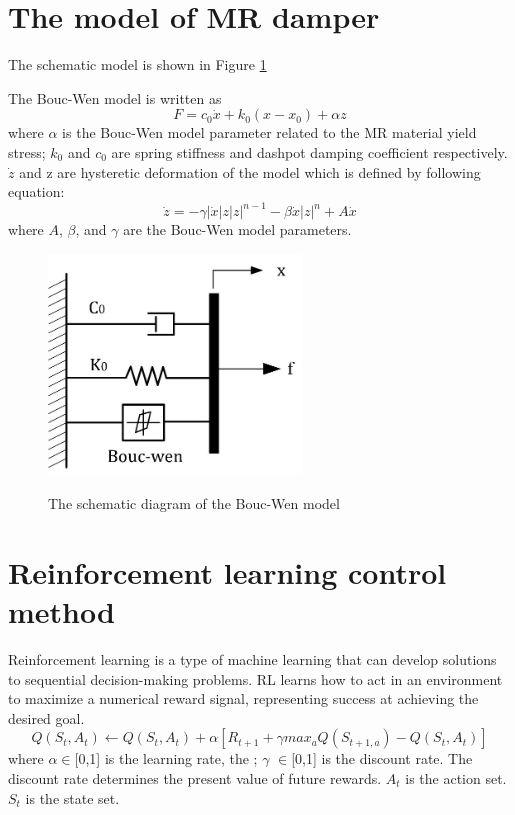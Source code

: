 \section{The model of MR damper}


The schematic model is shown in Figure \ref{bouc-wen}

The Bouc-Wen model is written as 
\begin{equation}F=c_0 \dot{x}+k_0(x-x_0)+\alpha z\end{equation}
where $\alpha$ is the Bouc-Wen model parameter related to the MR material yield stress; $k_0$ and $c_0$ are spring stiffness and dashpot damping coefficient respectively. $\dot{z}$ and z are hysteretic deformation of the model which is defined by following equation:
\begin{equation}\dot{z}=-\gamma|\dot{x}|z|z|^{n-1}-\beta \dot{x}|z|^n+A\dot{x}\end{equation}
where $A$, $\beta$, and $\gamma$ are the Bouc-Wen model parameters.

\begin{figure}[!h]
\centering
{\includegraphics[width=0.6\textwidth]{bouc-wen.jpg}} 
\caption{The schematic diagram of the Bouc-Wen model} 
\label{bouc-wen} 
\end{figure} 

\section{Reinforcement learning control method}

Reinforcement learning is a type of machine learning that can develop solutions to sequential decision-making problems.  RL learns how to act in an environment to maximize a numerical reward signal, representing success at achieving the desired goal. 
\begin{equation}Q(S_t,A_t) \leftarrow Q(S_t,A_t)+\alpha [R_{t+1} + \gamma max_{a}Q(S_{t+1,a})-Q(S_t,A_t)]\end{equation}
where $\alpha \in$[0,1] is the learning rate, the ; $\gamma$ $\in$[0,1] is the discount rate. The discount rate determines the present value of future rewards. $A_t$ is the action set. $S_t$ is the state set.



